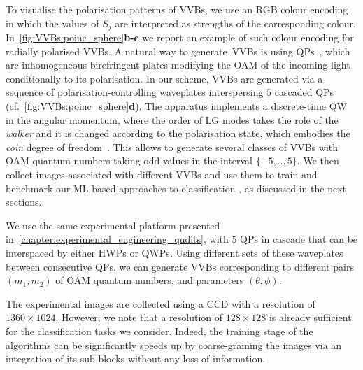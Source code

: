 To visualise the polarisation patterns of \acp{VVB}, we use an RGB colour encoding in which the values of $S_j$ are interpreted as strengths of the corresponding colour. In~\cref{fig:VVBs:poinc_sphere}\textbf{b-c} we report an example of such colour encoding for radially polarised \acp{VVB}.
A natural way to generate~\acp{VVB} is using \acp{QP}~\cite{marrucci2006optical,cardano2012polarization}, which are inhomogeneous birefringent plates modifying the OAM of the incoming light conditionally to its polarisation. 
In our scheme, \acp{VVB} are generated via a sequence of polarisation-controlling waveplates interspersing $5$ cascaded QPs (cf.~\cref{fig:VVBs:poinc_sphere}\textbf{d}).
The apparatus implements a discrete-time QW in the angular momentum, where the order of LG modes takes the role of the \emph{walker} and it is changed according to the polarisation state, which embodies the \emph{coin} degree of freedom~\cite{zhang2010implementation,goyal2013implementing,cardano2015quantum,innocenti2017quantum,giordani2019experimental}.
This allows to generate several classes of VVBs with OAM quantum numbers taking odd values in the interval $\{-5,..,5\}$.
We then collect images associated with different \acp{VVB} and use them to train and benchmark our ML-based approaches to classification , as discussed in the next sections.


We use the same experimental platform presented in~\cref{chapter:experimental_engineering_qudits}, with $5$ \acp{QP} in cascade that can be interspaced by either \acp{HWP} or \acp{QWP}. 
Using different sets of these waveplates between consecutive QPs, we can generate VVBs corresponding to different pairs $(m_1,m_2)$ of OAM quantum numbers, and parameters $(\theta, \phi)$.


The experimental images are collected using a \ac{CCD} with a resolution of $1360 \times 1024$. 
However, we note that a resolution of $128 \times 128$ is already sufficient for the classification tasks we consider. Indeed, the training stage of the algorithms can be significantly speeds up by coarse-graining the images via an integration of its sub-blocks without any loss of information. 

